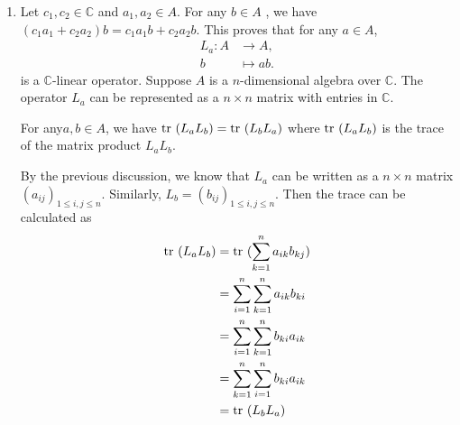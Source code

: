 \documentclass[a4paper, 12pt]{article}
\begin{document}
\begin{solution}
\begin{enumerate}[(1)]
\item Let \(c_1,c_2\in \mathbb{C}\) and \(a_1,a_2\in A\). For any \(b\in A\) , we have \((c_1a_1+c_2a_2)b=c_1a_1b+c_2a_2b\). This proves that for any \(a\in A\), 
\begin{align*}
    L_a:A&\rightarrow A,\\ 
        b&\mapsto ab.
\end{align*}
is a \(\mathbb{C}\)-linear operator. Suppose \(A\) is a \(n\)-dimensional algebra over \(\mathbb{C}\). The operator \(L_a\) can be represented as a \(n\times n\) matrix with entries in \(\mathbb{C}\). 
\begin{claim}
For any\(a,b\in A\), we have \(\text{tr}\  (L_aL_b)=\text{tr}\ (L_bL_a)\) where \(\text{tr}\ (L_aL_b)\) is the trace of the matrix product \(L_aL_b\). 
\end{claim}
\begin{claimproof}
By the previous discussion, we know that \(L_a\) can be written as a \(n\times n\) matrix \((a_{ij})_{1\leq i,j\leq n}\). Similarly, \(L_b=(b_{ij})_{1\leq i,j\leq n}\). Then the trace can be calculated as 
\begin{align*}
    \text{tr}\ (L_aL_b)&=\text{tr}\ (\sum_{k=1}^{n}a_{ik}b_{kj})\\ 
               &=\sum_{i=1}^{n}\sum_{k=1}^{n}a_{ik}b_{ki}\\ 
               &=\sum_{i=1}^{n}\sum_{k=1}^{n}b_{ki}a_{ik}\\ 
               &=\sum_{k=1}^{n}\sum_{i=1}^{n}b_{ki}a_{ik}\\ 
               &=\text{tr}\ (L_bL_a)
\end{align*}
\end{claimproof}


\end{enumerate}
\end{solution}
\end{document}
